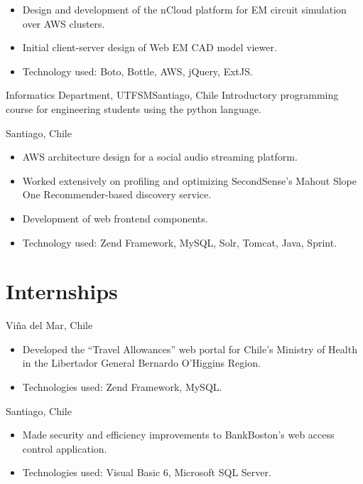 \documentclass[sans,letter]{moderncv}
\begin{document}
{}{\begin{itemize}
  \item Design and development of the nCloud platform for EM circuit simulation
  over AWS clusters.
  \item Initial client-server design of Web EM CAD model viewer.
  \item Technology used: Boto, Bottle, AWS, jQuery, ExtJS.
\end{itemize}}

{Informatics Department, UTFSM}{Santiago, Chile}{}
{Introductory programming course for engineering students using the
python language.}

{Santiago, Chile}{}{\begin{itemize}
  \item AWS architecture design for a social audio streaming platform.
  \item Worked extensively on profiling and optimizing SecondSense's Mahout Slope One Recommender-based discovery service.
  \item Development of web frontend components.
  \item Technology used: Zend Framework, MySQL, Solr, Tomcat, Java, Sprint.
\end{itemize}}

\newpage

\section{Internships}

{Viña del Mar, Chile}{}{\begin{itemize}
\item Developed the ``Travel Allowances'' web portal for Chile’s Ministry of Health in the Libertador General Bernardo O'Higgins Region.
\item Technologies used: Zend Framework, MySQL.
\end{itemize}}

{Santiago, Chile}{}{\begin{itemize}
  \item Made security and efficiency improvements to BankBoston's web access
  control application.
  \item Technologies used: Visual Basic 6, Microsoft SQL Server.
\end{itemize}}
\end{document}
